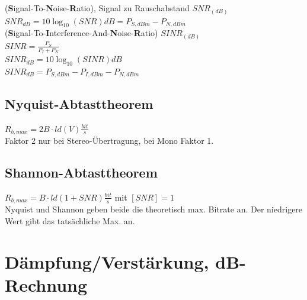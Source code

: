 \documentclass[fs, footer]{latex4ei}
\begin{document}
\begin{multicols*}{4}
{	 (\textbf{S}ignal-To-\textbf{N}oise-\textbf{R}atio), Signal zu Rauschabstand $SNR_{(dB)}$ \\
$SNR_{dB} = 10 \log_{10}(SNR)  dB = P_{S,dBm} - P_{N,dBm} $ \\
	
	
	 (\textbf{S}ignal-To-\textbf{I}nterference-And-\textbf{N}oise-\textbf{R}atio) $SINR_{(dB)}$ \\
	$SINR = \frac{P_S}{P_I + P_N}$   \\
	$SINR_{dB} = 10 \log_{10}(SINR)  dB $ \\
	$SINR_{dB} = P_{S,dBm} - P_{I,dBm} - P_{N,dBm}$ \\
	
	
	
	\subsection{Nyquist-Abtasttheorem}
	$ R_{b,max} = 2 B \cdot ld(V) \frac{bit}{s} $ \\
	Faktor 2 nur bei Stereo-Übertragung, bei Mono Faktor 1. \\

	\subsection{Shannon-Abtasttheorem}
	$ R_{b,max} = B \cdot ld (1+ SNR) \frac{bit}{s}$ mit $[SNR] = 1 $ \\
	
	Nyquist und Shannon geben beide die theoretisch max. Bitrate an. Der niedrigere Wert gibt das tatsächliche Max. an. \\


}



 \section{Dämpfung/Verstärkung, dB-Rechnung}
 
\end{multicols*}
\end{document}
